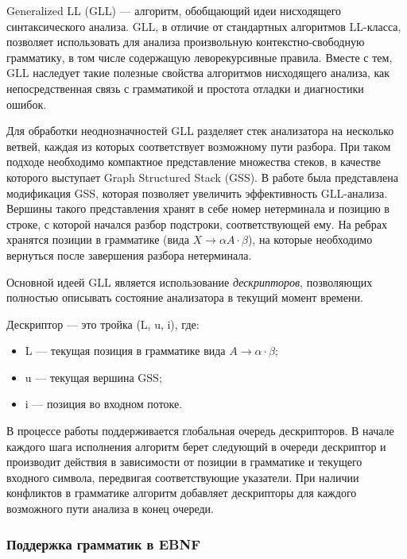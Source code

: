 Generalized LL (GLL) --- алгоритм, обобщающий идеи нисходящего синтаксического анализа. GLL, в отличие от стандартных алгоритмов LL-класса, позволяет использовать для анализа произвольную контекстно-свободную грамматику, в том числе содержащую леворекурсивные правила. Вместе с тем, GLL наследует такие полезные свойства алгоритмов нисходящего анализа, как непосредственная связь с грамматикой и простота отладки и диагностики ошибок.

Для обработки неоднозначностей GLL разделяет стек анализатора на несколько ветвей, каждая из которых соответствует возможному пути разбора. При таком подходе необходимо компактное представление множества стеков, в качестве которого выступает Graph Structured Stack (GSS). В работе \cite{Afroozeh2015gss} была представлена модификация GSS, которая позволяет увеличить эффективность GLL-анализа. Вершины такого представления хранят в себе номер нетерминала и позицию в строке, с которой начался разбор подстроки, соответствующей ему. На ребрах хранятся позиции в грамматике (вида $X \rightarrow \alpha A \cdot \beta$), на которые необходимо вернуться после завершения разбора нетерминала. 

Основной идеей GLL является использование \textit{дескрипторов}, позволяющих полностью описывать состояние анализатора в текущий момент времени.

\begin{defn}
	Дескриптор --- это тройка (L, u, i), где:
	\begin{itemize}
		\setlength\itemsep{0em}
		\item L --- текущая позиция в грамматике вида $A \rightarrow \alpha \cdot \beta$;
		\item u --- текущая вершина GSS;
		\item i --- позиция во входном потоке.
	\end{itemize}
\end{defn}  

В процессе работы поддерживается глобальная очередь дескрипторов. В начале каждого шага исполнения алгоритм берет следующий в очереди дескриптор и производит действия в зависимости от позиции в грамматике и текущего входного символа, передвигая соответствующие указатели. 
При наличии конфликтов в грамматике алгоритм добавляет дескрипторы для каждого возможного пути анализа в конец очереди.

\subsubsection{Поддержка грамматик в EBNF}

